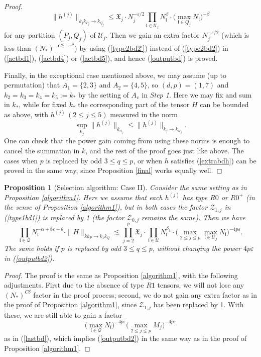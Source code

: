 \documentclass[11 pt,reqno]{amsart}
\newtheorem{prop}[thm]{Proposition}
\theoremstyle{definition}
\theoremstyle{remark}
\numberwithin{equation}{section}
\newcommand{\Qc}{\mathcal{Q}}
\newcommand{\Uc}{\mathcal{U}}
\newcommand{\Zc}{\mathcal{Z}}
\newcommand{\Xf}{\mathfrak{X}}
\newcommand{\lf}{\mathfrak{l}}
\begin{document}
{\begin{proof}
\begin{equation}\label{type2bd2'}
\|h^{(j)}\|_{k_jk_{P_j}\to k_{Q_j}}\leq \Xf_j\cdot N_j^{-\varepsilon/2}\prod_{\lf\in\Uc_j}N_\lf^\beta\cdot\big(\max_{\lf\in Q_j}N_\lf\big)^{-\beta}\end{equation} 
for any partition $(P_j, Q_j)$ of $\Uc_j$. Then we gain an extra factor $N_j^{-\varepsilon/2}$ (which is less than $(N_*)^{-C\delta- \varepsilon^3}$) by using (\ref{type2bd2'}) instead of (\ref{type2bd2}) in (\ref{actbd1}), (\ref{actbd4}) or (\ref{actbd5}),  and hence (\ref{outputbd}) is proved.

Finally, in the exceptional case mentioned above, we may assume (up to permutation) that $A_1=\{2,3\}$ and $A_2=\{4,5\}$, so $(d,p)=(1,7)$ and $k_2=k_3=k_4=k_5:=k_*$ by the setting of $A_v$ in \emph{Step 1}. Here we may fix and sum in $k_*$, while for fixed $k_*$ the corresponding part of the tensor $H$ can be bounded as above, with $h^{(j)}\,(2\leq j\leq 5)$ measured in the norm
\[\sup_{k_j}\|h^{(j)}\|_{k_{\Uc_j}}\leq \|h^{(j)}\|_{k_j\to k_{\Uc_j}}.\] One can check that the power gain coming from using these norms is enough to cancel the summation in $k$, and the rest of the proof goes just like above. The cases when $p$ is replaced by odd $3\leq q\leq p$, or when $h$ satisfies (\ref{extrabdh}) can be proved in the same way, since Proposition \ref{final} works equally well.
\end{proof}
\begin{prop}[Selection algorithm: Case II]\label{algorithm2} Consider the same setting as in Proposition \ref{algorithm1}. Here we assume that each $h^{(j)}$ has type $R0$ or $R0^+$ (in the sense of Proposition \ref{algorithm1}), but in both cases the factor $\Zc_{1,j}$ in (\ref{type1bd1}) is replaced by 1 (the factor $\Zc_{0,j}$ remains the same). Then we have
\begin{equation}\label{outputbd2}\prod_{\lf\in\Qc}N_\lf^{-\alpha+8\varepsilon+\theta}\cdot\|H\|_{kk_P\to k_1k_Q}\lesssim\prod_{j=2}^{p}\Xf_j\cdot\prod_{\lf\in\Uc}N_\lf^{\beta_1}\cdot \big(\max_{2\leq j\leq p}\max_{\lf\in\Uc_j}N_\lf\big)^{-4p\varepsilon}.
\end{equation} The same holds if $p$ is replaced by odd $3\leq q\leq p$, without changing the power $4p\varepsilon$ in (\ref{outputbd2}).
\end{prop}
\begin{proof} The proof is the same as Proposition \ref{algorithm1}, with the following adjustments. First due to the absence of type $R1$ tensors, we will not lose any $(N_*)^{C\delta}$ factor in the proof process; second, we do not gain any extra factor as in the proof of Proposition \ref{algorithm1}, since $\Zc_{1,j}$ has been replaced by 1. With these, we are still able to gain a factor
\[\big(\max_{\lf\in\Qc}N_\lf\big)^{-4p\varepsilon}\big(\max_{2\leq j\leq p}M_j\big)^{-4p\varepsilon}\] as in (\ref{lastbd}), which implies (\ref{outputbd2}) in the same way as in the proof of Proposition \ref{algorithm1}.
\end{proof}
}
\end{document}

